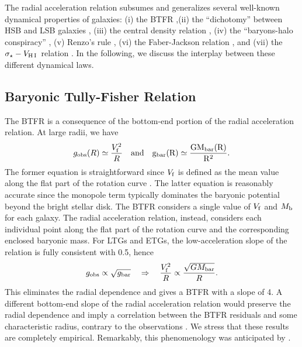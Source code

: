 \documentclass[apjl, twocolappendix]{emulateapj}
\newcommand{\hi } {{\rm H}\,{\small\rm I} \,}
\begin{document}
The radial acceleration relation subsumes and generalizes several well-known dynamical properties of galaxies: (i) the BTFR \citep{McGaugh2000},(ii) the ``dichotomy'' between HSB and LSB galaxies \citep{deBlok1997, Tully1997}, (iii) the central density relation \citep{Lelli2013, Lelli2016c}, (iv) the ``baryons-halo conspiracy'' \citep{vanAlbada1986}, (v) Renzo's rule \citep{Sancisi2004}, (vi) the Faber-Jackson relation \citep{Faber1976}, and (vii) the $\sigma_{\star}-V_{\hi}$ relation \citep{Serra2016}. In the following, we discuss the interplay between these different dynamical laws.

\subsection{Baryonic Tully-Fisher Relation}

The BTFR is a consequence of the bottom-end portion of the radial acceleration relation. At large radii, we have
\begin{equation}\label{Eq:BTFR}
 g_{\rm obs}(R) \simeq \dfrac{V_{\rm f}^{2}}{R} \quad \rm{and} \quad g_{\rm bar}(R) \simeq \dfrac{G M_{\rm bar}(R)}{R^2}.
\end{equation}
The former equation is straightforward since $V_{\rm f}$ is defined as the mean value along the flat part of the rotation curve \citep[e.g.,][]{Lelli2016}. The latter equation is reasonably accurate since the monopole term typically dominates the baryonic potential beyond the bright stellar disk. The BTFR considers a single value of $V_{\rm f}$ and $M_{\rm b}$ for each galaxy. The radial acceleration relation, instead, considers each individual point along the flat part of the rotation curve and the corresponding enclosed baryonic mass. For LTGs and ETGs, the low-acceleration slope of the relation is fully consistent with 0.5, hence
\begin{equation}
 g_{\rm obs}\propto \sqrt{g_{\rm bar}} \quad \Rightarrow \quad \dfrac{V_{\rm f}^{2}}{R} \propto \dfrac{\sqrt{G M_{\rm bar}}}{R}.
\end{equation}
This eliminates the radial dependence and gives a BTFR with a slope of 4. A different bottom-end slope of the radial acceleration relation would preserve the radial dependence and imply a correlation between the BTFR residuals and some characteristic radius, contrary to the observations \citep[e.g.,][]{Lelli2016}. We stress that these results are completely empirical. Remarkably, this phenomenology was anticipated by \citet{Milgrom1983}.
\end{document}
